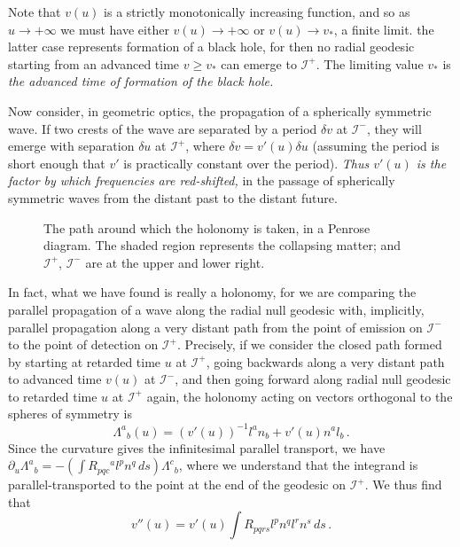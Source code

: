 \documentclass[12pt]{article}
\newcommand{\scrif}{{{\mathscr I}^{+}}}
\newcommand{\scrip}{{{\mathscr I}^{-}}}
\newcommand{\vv}{{v}}
\begin{document}
Note that $\vv (u)$ is a strictly monotonically increasing function, and so as $u\to +\infty$ we must have either $\vv (u)\to +\infty$ or $\vv (u)\to v_*$, a finite limit.  the latter case represents formation of a black hole, for then no radial geodesic starting from an advanced time $v\geq v_*$ can emerge to $\scrif$.  The limiting value $v_*$ is {\em the advanced time of formation of the black hole.}

Now consider, in geometric optics, the propagation of a spherically symmetric wave.  If two crests of the wave are separated by a period $\delta v$ at $\scrip$, they will emerge with separation $\delta u$ at $\scrif$, where $\delta v=\vv '(u) \delta u$ (assuming the period is short enough that $\vv '$ is practically constant over the period).  {\em Thus $\vv '(u)$ is the factor by which frequencies are red-shifted,} in the passage of spherically symmetric waves from the distant past to the distant future.   

\begin{figure}
\caption{The path around which the holonomy is taken, in a Penrose diagram.  The shaded region represents the collapsing matter; and $\scrif$, $\scrip$ are at the upper and lower right.}
\label{fig:spherhol}
\end{figure}

In fact, what we have found is really a holonomy, for we are comparing the parallel propagation of a wave along the radial null geodesic with, implicitly, parallel propagation along a very distant path from the point of emission on $\scrip$ to the point of detection on $\scrif$.  Precisely, if we consider the closed path formed by starting at retarded time $u$ at $\scrif$, going backwards along a very distant path to advanced time $\vv (u)$ at $\scrip$, and then going forward along radial null geodesic to retarded time $u$ at $\scrif$ again, the holonomy acting on vectors orthogonal to the spheres of symmetry is
\begin{equation}
  \Lambda ^a{}_b(u)=(\vv ' (u))^{-1}  l^an_b+ \vv '(u) n^al_b\, .
\end{equation}
Since the curvature gives the infinitesimal parallel transport, we have $\partial _u\Lambda ^a{}_b=-(\int R_{pqc}{}^a l^pn^q\, ds)\Lambda ^c{}_b$,
where we understand that the integrand is 
parallel-transported to the point at the end of the geodesic on $\scrif$.  We thus find that
\begin{equation}\label{vac}
 \vv ''(u)=\vv '(u) \int R_{pqrs}l^pn^ql^rn^s{}\, ds\, .
\end{equation}
\end{document}
